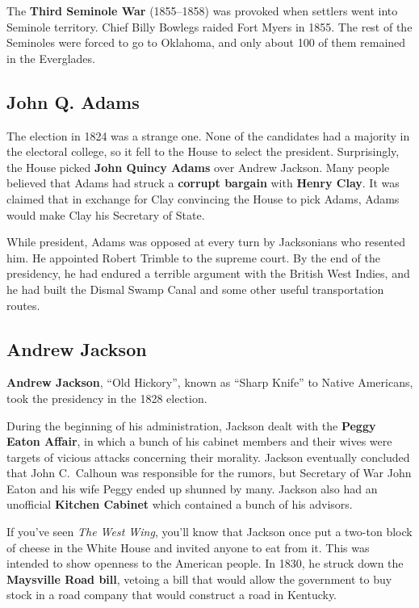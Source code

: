 The \textbf{Third Seminole War} (1855--1858) was provoked when settlers went into Seminole territory.
Chief Billy Bowlegs raided Fort Myers in 1855.
The rest of the Seminoles were forced to go to Oklahoma, and only about 100 of them remained in the Everglades.

\subsection*{John Q. Adams}

The election in 1824 was a strange one.
None of the candidates had a majority in the electoral college, so it fell to the House to select the president.
Surprisingly, the House picked \textbf{John Quincy Adams} over Andrew Jackson.
Many people believed that Adams had struck a \textbf{corrupt bargain} with \textbf{Henry Clay}.
It was claimed that in exchange for Clay convincing the House to pick Adams,
Adams would make Clay his Secretary of State.

While president, Adams was opposed at every turn by Jacksonians who resented him.
He appointed Robert Trimble to the supreme court.
By the end of the presidency, he had endured a terrible argument with the British West Indies,
and he had built the Dismal Swamp Canal and some other useful transportation routes.

\subsection*{Andrew Jackson}

\textbf{Andrew Jackson}, ``Old Hickory'', known as ``Sharp Knife'' to Native Americans,
took the presidency in the 1828 election.

During the beginning of his administration, Jackson dealt with the \textbf{Peggy Eaton Affair},
in which a bunch of his cabinet members and their wives were targets of vicious attacks concerning their morality.
Jackson eventually concluded that John C.\ Calhoun was responsible for the rumors,
but Secretary of War John Eaton and his wife Peggy ended up shunned by many.
Jackson also had an unofficial \textbf{Kitchen Cabinet} which contained a bunch of his advisors.

If you've seen \textit{The West Wing},
you'll know that Jackson once put a two-ton block of cheese in the White House and invited anyone to eat from it.
This was intended to show openness to the American people.
In 1830, he struck down the \textbf{Maysville Road bill},
vetoing a bill that would allow the government to buy stock in a road company that would construct a road in Kentucky.


